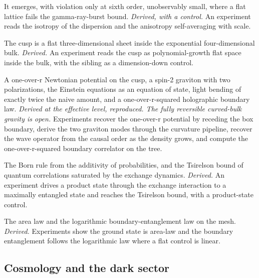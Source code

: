 \begin{finding}
It emerges, with violation only at sixth order, unobservably small, where a flat lattice fails the gamma-ray-burst bound. \emph{Derived, with a control.} An experiment reads the isotropy of the dispersion and the anisotropy self-averaging with scale.
\end{finding}

\begin{finding}
The cusp is a flat three-dimensional sheet inside the exponential four-dimensional bulk. \emph{Derived.} An experiment reads the cusp as polynomial-growth flat space inside the bulk, with the sibling as a dimension-down control.
\end{finding}

\begin{finding}[Gravity]
A one-over-r Newtonian potential on the cusp, a spin-2 graviton with two polarizations, the Einstein equations as an equation of state, light bending of exactly twice the naive amount, and a one-over-r-squared holographic boundary law. \emph{Derived at the effective level, reproduced. The fully reversible curved-bulk gravity is open.} Experiments recover the one-over-r potential by receding the box boundary, derive the two graviton modes through the curvature pipeline, recover the wave operator from the causal order as the density grows, and compute the one-over-r-squared boundary correlator on the tree.
\end{finding}

\begin{finding}
The Born rule from the additivity of probabilities, and the Tsirelson bound of quantum correlations saturated by the exchange dynamics. \emph{Derived.} An experiment drives a product state through the exchange interaction to a maximally entangled state and reaches the Tsirelson bound, with a product-state control.
\end{finding}

\begin{finding}[Holography]
The area law and the logarithmic boundary-entanglement law on the mesh. \emph{Derived.} Experiments show the ground state is area-law and the boundary entanglement follows the logarithmic law where a flat control is linear.
\end{finding}

\subsection*{Cosmology and the dark sector}

